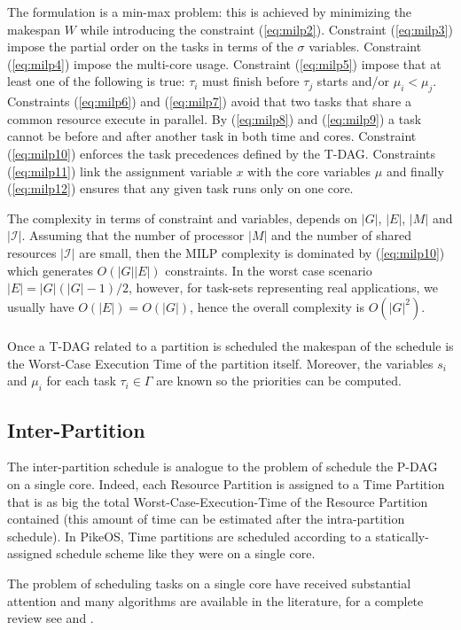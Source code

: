\par The formulation is a min-max problem: this is achieved by minimizing the makespan $W$ while introducing the constraint (\ref{eq:milp2}). Constraint (\ref{eq:milp3}) impose the partial order on the tasks in terms of the $\sigma$ variables. Constraint (\ref{eq:milp4}) impose the multi-core usage. Constraint (\ref{eq:milp5}) impose that at least one of the following is true: $\tau_i$ must finish before $\tau_j$ starts and/or $\mu_i<\mu_j$. Constraints (\ref{eq:milp6}) and (\ref{eq:milp7}) avoid that two tasks that share a common resource execute in parallel. By (\ref{eq:milp8}) and (\ref{eq:milp9}) a task cannot be before and after another task in both time and cores. Constraint (\ref{eq:milp10}) enforces the task precedences defined by the T-DAG. Constraints (\ref{eq:milp11}) link the assignment variable $x$ with the core variables $\mu$ and finally (\ref{eq:milp12}) ensures that any given task runs only on one core.
\par The complexity in terms of constraint and variables, depends on $|G|$, $|E|$, $|M|$ and $|\mathcal{I}|$. Assuming that the number of processor $|M|$ and the number of shared resources $|\mathcal{I}|$ are small, then the MILP complexity is dominated by (\ref{eq:milp10}) which generates $O(|G||E|)$ constraints. In the worst case scenario $|E|=|G|(|G|-1)/2$, however, for task-sets representing real applications, we usually have $O(|E|)=O(|G|)$, hence the overall complexity is $O(|G|^2)$.

\paragraph{} Once a T-DAG related to a partition is scheduled the makespan of the schedule is the Worst-Case Execution Time of the partition itself. Moreover, the variables $s_i$ and $\mu_i$ for each task $\tau_i\in\Gamma$ are known so the priorities can be computed.

\subsection{Inter-Partition}\label{interpartition}
The inter-partition schedule is analogue to the problem of schedule the P-DAG on a single core. Indeed, each Resource Partition is assigned to a Time Partition that is as big the total Worst-Case-Execution-Time of the Resource Partition contained (this amount of time can be estimated after the intra-partition schedule). In PikeOS, Time partitions are scheduled according to a statically-assigned schedule scheme like they were on a single core.
\par The problem of scheduling tasks on a single core have received substantial attention and many algorithms are available in the literature, for a complete review see \cite{buttazzoRT} and \cite{blazewiczScheduling}.

